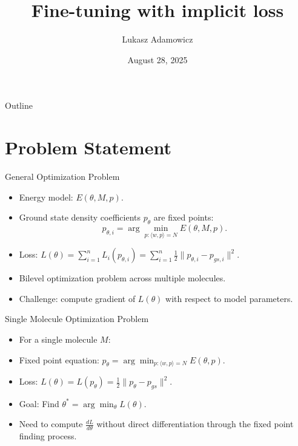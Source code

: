 \documentclass{beamer}
\title[Implicit Loss Fine-Tuning]{Fine-tuning with implicit loss}
\author{Lukasz Adamowicz}
\date{August 28, 2025}
\begin{document}
\begin{frame}
  \titlepage
\end{frame}

\begin{frame}{Outline}
  \tableofcontents
\end{frame}


\section{Problem Statement}
\begin{frame}{General Optimization Problem}
  \begin{itemize}
    \item Energy model: $E(\theta, M, p)$.
    \item Ground state density coefficients $p_{\theta}$ are fixed points:
    \[
      p_{\theta,i} = \arg\min_{p:\langle w,p \rangle = N} E(\theta, M, p).
    \]
    \item Loss: $L(\theta) = \sum_{i=1}^{n} L_i(p_{\theta,i}) = \sum_{i=1}^{n} \frac{1}{2} \|p_{\theta,i} - p_{gs,i}\|^2$.
    \item Bilevel optimization problem across multiple molecules.
    \item Challenge: compute gradient of $L(\theta)$ with respect to model parameters.
  \end{itemize}
\end{frame}

\begin{frame}{Single Molecule Optimization Problem}
  \begin{itemize}
    \item For a single molecule $M$:
    \item Fixed point equation: $p_{\theta} = \arg\min_{p:\langle w,p \rangle = N} E(\theta, p)$.
    \item Loss: $L(\theta) = L(p_{\theta}) = \frac{1}{2}\|p_{\theta} - p_{gs}\|^2$.
    \item Goal: Find $\theta^* = \arg\min_{\theta} L(\theta)$.
    \item Need to compute $\frac{dL}{d\theta}$ without direct differentiation through the fixed point finding process.
  \end{itemize}
\end{frame}

\end{document}
